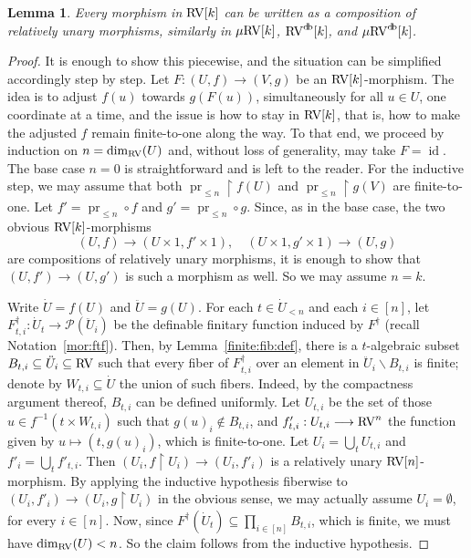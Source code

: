 \documentclass[12pt]{amsart}
\theoremstyle{plain}
\newtheorem{lem}[thm]{Lemma}
\theoremstyle{definition}
\theoremstyle{remark}
\numberwithin{equation}{section}
\theoremstyle{plain}
\newcommand{\RV}{\textup{RV}}
\DeclareMathOperator{\id}{id}
\DeclareMathOperator{\pr}{pr}
\newcommand{\0}{\emptyset}
\newcommand{\mdl}[1]{\mathcal{#1}}  %
\newcommand{\rest}{\upharpoonright}
\newcommand{\fun}{\longrightarrow}
\newcommand{\efun}{\longmapsto}
\newcommand{\sub}{\subseteq}
\newcommand{\mi}{\smallsetminus}
\newcommand{\mRV}{{\mu}{\RV}}
\DeclareMathOperator{\db}{d \! b}
\begin{document}
\begin{lem}\label{bijection:partitioned:unary}
Every morphism in $\RV[k]$ can be written as a composition of relatively unary morphisms, similarly in $\mRV[k]$, $\RV^{\db}[k]$, and $\mRV^{\db}[k]$.
\end{lem}
\begin{proof}
It is enough to show this piecewise, and the situation can be  simplified accordingly step by step. Let $F : (U, f) \fun (V, g)$ be an $\RV[k]$-morphism. The idea is to adjust  $f(u)$ towards $g(F(u))$, simultaneously for all $u \in U$, one coordinate at a time, and the issue is how to stay in $\RV[k]$, that is, how to make the adjusted $f$ remain finite-to-one along the way. To that end, we proceed by induction on $n = \dim_{\RV}(U)$ and, without loss of generality, may take $F = \id$. The base case $n=0$ is straightforward and is left to the reader. For the inductive step, we may assume that both $\pr_{\leq n} \rest f(U)$ and $\pr_{\leq n} \rest g(V)$ are finite-to-one. Let $f' = \pr_{\leq n} \circ f$ and $g' = \pr_{\leq n} \circ g$. Since, as in the base case, the two obvious $\RV[k]$-morphisms
\[
(U,f) \fun (U \times 1, f' \times 1), \quad (U \times 1, g' \times 1) \fun (U, g)
\]
are compositions of relatively unary morphisms, it is enough to show that $(U, f') \fun (U, g')$ is such a morphism as well. So we may assume $n=k$.

Write $\dot U = f(U)$ and $\ddot U = g(U)$. For each $t \in \dot U_{< n}$ and each $i \in [n]$, let
$F^\dag_{t, i} : \dot U_t \fun \mdl P(\ddot U_i)$
be the definable finitary function induced by $F^\dag$ (recall Notation~\ref{mor:ftf}). Then, by Lemma~\ref{finite:fib:def}, there is a $t$-algebraic subset $B_{t, i} \sub \ddot U_i \sub \RV$ such that every fiber of $F^\dag_{t, i}$ over an element in $\ddot U_i \mi B_{t, i}$ is finite; denote by $W_{t, i} \sub \dot U$ the union of such fibers. Indeed, by the compactness argument thereof,  $B_{t, i}$ can be defined uniformly. Let $U_{t, i}$ be the set of those $u \in f^{-1}( t \times W_{t, i})$ such that $g(u)_i \notin B_{t, i}$, and $f'_{t, i} : U_{t, i} \fun \RV^n$ the function given by $u \efun (t, g(u)_i)$, which is finite-to-one. Let $U_i = \bigcup_{t}  U_{t, i}$ and $f'_i = \bigcup_{t}  f'_{t, i}$. Then $(U_i, f \rest U_i) \fun (U_i, f'_i)$ is a relatively unary $\RV[n]$-morphism. By applying the inductive hypothesis fiberwise to $(U_i, f'_i) \fun (U_i, g \rest U_i)$ in the obvious sense, we may actually assume $U_i = \0$, for every $i \in [n]$. Now, since $F^\dag(\dot U_t) \sub \prod_{i \in [n]} B_{t, i}$, which is finite, we must have $\dim_{\RV}(U) < n$. So the claim follows from the inductive hypothesis.


\end{proof}
\end{document}
